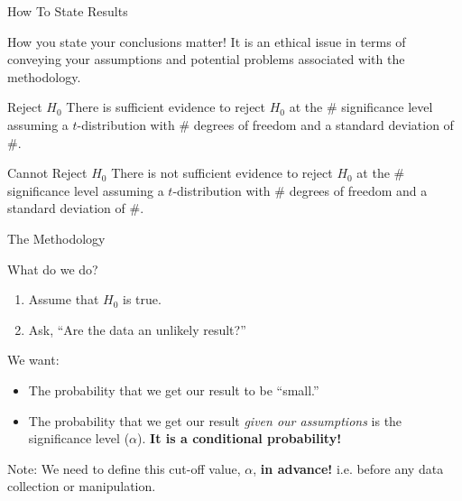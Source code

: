 \begin{frame}{How To State Results}

  How you state your conclusions matter! It is an ethical issue in
  terms of conveying your assumptions and potential problems
  associated with the methodology.

  \begin{block}{Reject $H_0$}
    There is sufficient evidence to reject $H_0$ at the \#
    significance level assuming a $t$-distribution with \# degrees of
    freedom and a standard deviation of \#.
  \end{block}

  \begin{block}{Cannot Reject $H_0$}
    There is not sufficient evidence to reject $H_0$ at the \#
    significance level assuming a $t$-distribution with \# degrees of
    freedom and a standard deviation of \#.
  \end{block}

  
\end{frame}

\begin{frame}{The Methodology}

  What do we do?

  \begin{enumerate}
  \item Assume that $H_0$ is true.
  \item Ask, ``Are the data an unlikely result?''
  \end{enumerate}

  {
    We want:
    \begin{itemize}
    \item The probability that we get our result to be ``small.''
    \item The probability that we get our result \textit{given our
        assumptions} is the significance level
      ($\alpha$). \textbf{\color{red} It is a conditional
        probability!}
    \end{itemize}
  }

  {
    Note: We need to define this cut-off value, $\alpha$, \textbf{in
      advance!} i.e. before any data collection or manipulation.
  }
  
\end{frame}


